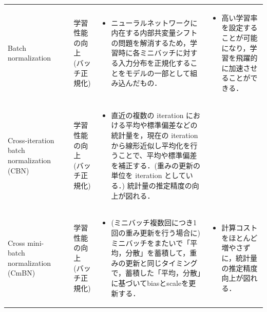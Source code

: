 \documentclass[originalpaper,fleqn]{jsaiart}     %
\begin{document}
\begin{table}
\begin{center}
\begin{tabularx}{\linewidth}{Xp{1.5cm}Xp{7cm}X}
            Batch normalization
            & \cite{IoffeSzege15} & 学習性能の向上 (バッチ正規化) & 
            \begin{itemize}
                \vspace{-0.7\baselineskip}
                \setlength{\leftskip}{-3mm}
                \item ニューラルネットワークに内在する内部共変量シフトの問題を解消するため，学習時に各ミニバッチに対する入力分布を正規化することをモデルの一部として組み込んだもの．
            \end{itemize}
            &
            \begin{itemize}
                \vspace{-0.7\baselineskip}
                \setlength{\leftskip}{-3mm}
                \item 高い学習率を設定することが可能になり，学習を飛躍的に加速させることができる．
            \end{itemize}
            \\

            Cross-iteration batch normalization (CBN)
            & \cite{YCZHL20} & 学習性能の向上 (バッチ正規化) & 
            \begin{itemize}
                \vspace{-0.7\baselineskip}
                \setlength{\leftskip}{-3mm}
                \item 直近の複数の iteration における平均や標準偏差などの統計量を，現在の iteration から線形近似し平均化を行うことで、平均や標準偏差を補正する．(重みの更新の単位を iteration としている．) 統計量の推定精度の向上が図れる．
            \end{itemize}
            &
            \\

            Cross mini-batch normalization (CmBN)
            & \cite{BWL20} & 学習性能の向上 (バッチ正規化) & 
            \begin{itemize}
                \vspace{-0.7\baselineskip}
                \setlength{\leftskip}{-3mm}
                \item (ミニバッチ複数回につき1回の重み更新を行う場合に)ミニバッチをまたいで「平均，分散」を蓄積して，重みの更新と同じタイミングで，蓄積した「平均，分散」に基づいてbiasとscaleを更新する．
            \end{itemize}
            &
            \begin{itemize}
                \vspace{-0.7\baselineskip}
                \setlength{\leftskip}{-3mm}
                \item 計算コストをほとんど増やさずに，統計量の推定精度向上が図れる．
            \end{itemize}
            \\


\end{tabularx}
\end{center}
\end{table}
\end{document}
